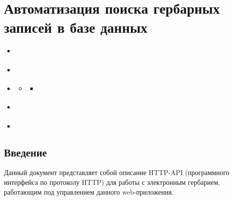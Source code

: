 \documentclass[letterpaper,10pt,russian]{sphinxmanual}
\begin{document}
\chapter{Автоматизация поиска гербарных записей в базе данных}
\label{\detokenize{http_api::doc}}\label{\detokenize{http_api:id1}}
\begin{sphinxShadowBox}
\begin{itemize}
\item {} 
\label{\detokenize{http_api:id14}}{\hyperref[\detokenize{http_api:index-0}]{}}

\item {} 
\label{\detokenize{http_api:id15}}{\hyperref[\detokenize{http_api:index-1}]{}}

\item {} 
\label{\detokenize{http_api:id16}}{\hyperref[\detokenize{http_api:index-2}]{}}
\begin{itemize}
\item {} 
\label{\detokenize{http_api:id17}}{\hyperref[\detokenize{http_api:index-3}]{}}
\begin{itemize}
\item {} 
\label{\detokenize{http_api:id18}}{\hyperref[\detokenize{http_api:index-4}]{}}

\end{itemize}

\end{itemize}

\item {} 
\label{\detokenize{http_api:id19}}{\hyperref[\detokenize{http_api:index-6}]{}}

\item {} 
\label{\detokenize{http_api:id20}}{\hyperref[\detokenize{http_api:index-7}]{}}

\end{itemize}
\end{sphinxShadowBox}

\ignorespaces 

\section{Введение}
\label{\detokenize{http_api:id3}}\label{\detokenize{http_api:index-0}}
Данный документ представляет собой описание HTTP-API (программного интерфейса по протоколу HTTP) для
работы с электронным гербарием, работающим под управлением данного web-приложения.
\end{document}

